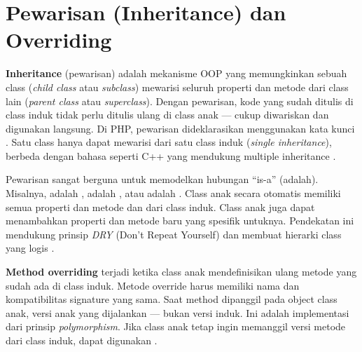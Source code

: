 \section{Pewarisan (Inheritance) dan Overriding}

\textbf{Inheritance} (pewarisan) adalah mekanisme OOP yang memungkinkan sebuah class (\textit{child class} atau \textit{subclass}) mewarisi seluruh properti dan metode dari class lain (\textit{parent class} atau \textit{superclass}). Dengan pewarisan, kode yang sudah ditulis di class induk tidak perlu ditulis ulang di class anak --- cukup diwariskan dan digunakan langsung. Di PHP, pewarisan dideklarasikan menggunakan kata kunci . Satu class hanya dapat mewarisi dari satu class induk (\textit{single inheritance}), berbeda dengan bahasa seperti C++ yang mendukung multiple inheritance \cite{phpManual}.

Pewarisan sangat berguna untuk memodelkan hubungan ``is-a'' (adalah). Misalnya,  adalah ,  adalah , atau  adalah . Class anak secara otomatis memiliki semua properti dan metode  dan  dari class induk. Class anak juga dapat menambahkan properti dan metode baru yang spesifik untuknya. Pendekatan ini mendukung prinsip \textit{DRY} (Don't Repeat Yourself) dan membuat hierarki class yang logis \cite{phpRightWay}.

\textbf{Method overriding} terjadi ketika class anak mendefinisikan ulang metode yang sudah ada di class induk. Metode override harus memiliki nama dan kompatibilitas signature yang sama. Saat method dipanggil pada object class anak, versi anak yang dijalankan --- bukan versi induk. Ini adalah implementasi dari prinsip \textit{polymorphism}. Jika class anak tetap ingin memanggil versi metode dari class induk, dapat digunakan  \cite{phpManual}.

